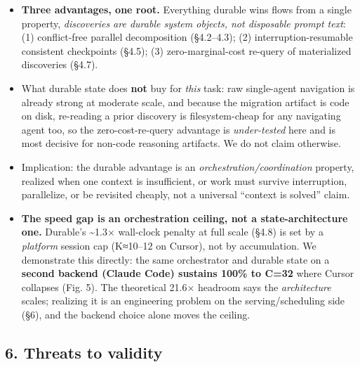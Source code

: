 \documentclass[
  10pt,
]{article}
\providecommand{\tightlist}{%
  \setlength{\itemsep}{0pt}\setlength{\parskip}{0pt}}
\begin{document}
\begin{itemize}
\tightlist
\item
  \textbf{Three advantages, one root.} Everything durable wins flows
  from a single property, \emph{discoveries are durable system objects,
  not disposable prompt text}: (1) conflict-free parallel decomposition
  (§4.2--4.3); (2) interruption-resumable consistent checkpoints (§4.5);
  (3) zero-marginal-cost re-query of materialized discoveries (§4.7).
\item
  What durable state does \textbf{not} buy for \emph{this} task: raw
  single-agent navigation is already strong at moderate scale, and
  because the migration artifact is code on disk, re-reading a prior
  discovery is filesystem-cheap for any navigating agent too, so the
  zero-cost-re-query advantage is \emph{under-tested} here and is most
  decisive for non-code reasoning artifacts. We do not claim otherwise.
\item
  Implication: the durable advantage is an
  \emph{orchestration/coordination} property, realized when one context
  is insufficient, or work must survive interruption, parallelize, or be
  revisited cheaply, not a universal ``context is solved'' claim.
\item
  \textbf{The speed gap is an orchestration ceiling, not a
  state-architecture one.} Durable's \textasciitilde1.3× wall-clock
  penalty at full scale (§4.8) is set by a \emph{platform} session cap
  (K≈10--12 on Cursor), not by accumulation. We demonstrate this
  directly: the same orchestrator and durable state on a \textbf{second
  backend (Claude Code) sustains 100\% to C=32} where Cursor collapses
  (Fig. 5). The theoretical 21.6× headroom says the \emph{architecture}
  scales; realizing it is an engineering problem on the
  serving/scheduling side (§6), and the backend choice alone moves the
  ceiling.
\end{itemize}

\subsection{6. Threats to validity}\label{threats-to-validity}
\end{document}
